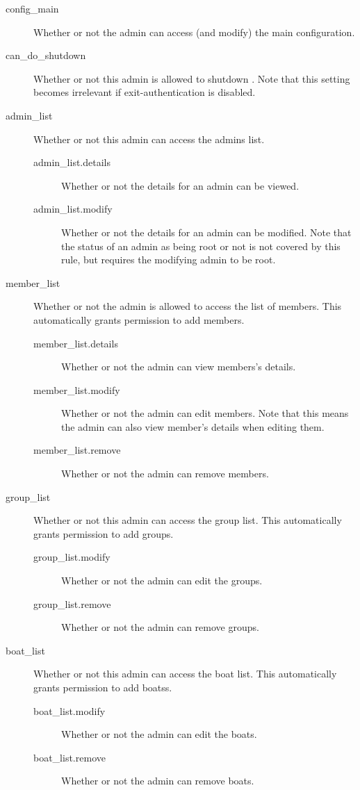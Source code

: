     \begin{description}
        \item [config\_main] Whether or not the admin can access (and modify) the main configuration.
    
        \item [can\_do\_shutdown] Whether or not this admin is allowed to shutdown \srl. Note that this setting becomes irrelevant if exit-authentication is disabled.
        
        \item [admin\_list] Whether or not this admin can access the admins list.
        \begin{description}
            \item [admin\_list.details] Whether or not the details for an admin
                    can be viewed.
            \item [admin\_list.modify] Whether or not the details for an admin
                    can be modified. Note that the status of an admin as being
                    root or not is not covered by this rule, but requires the
                    modifying admin to be root.
        \end{description}
        
        \item [member\_list] Whether or not the admin is allowed to access the list of members. This automatically grants permission to add members.
        \begin{description}
            \item [member\_list.details] Whether or not the admin can view members's details.
            \item [member\_list.modify] Whether or not the admin can edit members. Note that this means the admin can also view member's details when editing them.
            \item [member\_list.remove] Whether or not the admin can remove members.
        \end{description}
        
        \item [group\_list] Whether or not this admin can access the group list. This automatically grants permission to add groups.
        \begin{description}
            \item [group\_list.modify] Whether or not the admin can edit the groups.
            \item [group\_list.remove] Whether or not the admin can remove groups.
        \end{description}
        
        \item [boat\_list] Whether or not this admin can access the boat list. This automatically grants permission to add boatss.
        \begin{description}
            \item [boat\_list.modify] Whether or not the admin can edit the boats.
            \item [boat\_list.remove] Whether or not the admin can remove boats.
        \end{description}
    \end{description}